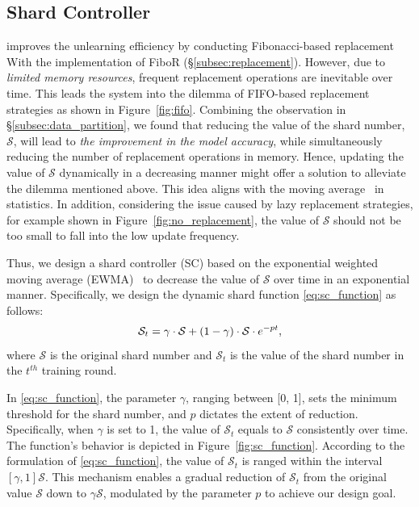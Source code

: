 \documentclass[conference,compsoc]{IEEEtran}
\begin{document}
\subsection{Shard Controller}
\label{subsec:shard_controller}

\tool improves the unlearning efficiency by conducting Fibonacci-based replacement With the implementation of FiboR (\S\ref{subsec:replacement}). However, due to \textit{limited memory resources}, frequent replacement operations are inevitable over time. This leads the system into the dilemma of FIFO-based replacement strategies as shown in Figure~\ref{fig:fifo}. Combining the observation in \S\ref{subsec:data_partition}, we found that reducing the value of the shard number, \ie $\mathcal{S}$, will lead to \textit{the improvement in the model accuracy}, while simultaneously reducing the number of replacement operations in memory. Hence, updating the value of $\mathcal{S}$ dynamically in a decreasing manner might offer a solution to alleviate the dilemma mentioned above. This idea aligns with the moving average~\cite{moving_average} in statistics. 
In addition, considering the issue caused by lazy replacement strategies, for example shown in Figure~\ref{fig:no_replacement}, the value of $\mathcal{S}$ should not be too small to fall into the low update frequency.

Thus, we design a shard controller (SC) based on the exponential weighted moving average (EWMA)~\cite{hunter1986exponentially} to decrease the value of $\mathcal{S}$ over time in an exponential manner. Specifically, we design the dynamic shard function \eqref{eq:sc_function} as follows:
\vspace{-0.5em}
\begin{equation}
\label{eq:sc_function}
    \mathcal{S}_t = \gamma \cdot \mathcal{S} + (1 - \gamma) \cdot  \mathcal{S} \cdot e^{-pt}, 
    \vspace{-0.5em}
\end{equation}
where $\mathcal{S}$ is the original shard number and $\mathcal{S}_t$ is the value of the shard number in the $t^{th}$ training round. 


In \eqref{eq:sc_function}, the parameter $\gamma$, ranging between [0, 1], sets the minimum threshold for the shard number, and $p$ dictates the extent of reduction. Specifically, when $\gamma$ is set to 1, the value of $\mathcal{S}_t$ equals to $\mathcal{S}$ consistently over time. The function's behavior is depicted in Figure~\ref{fig:sc_function}. According to the formulation of \eqref{eq:sc_function}, the value of $\mathcal{S}_t$ is ranged within the interval $[\gamma, 1]\mathcal{S}$. This mechanism enables a gradual reduction of $\mathcal{S}_t$ from the original value $\mathcal{S}$ down to $\gamma \mathcal{S}$, modulated by the parameter $p$ to achieve our design goal.
\end{document}
